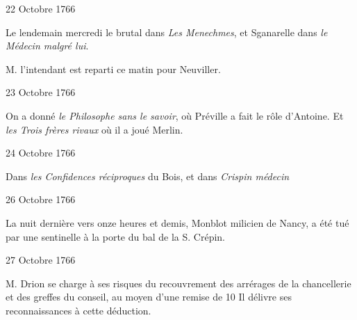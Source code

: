                      \begin{diary}{22 Octobre 1766}{}

                         Le lendemain mercredi le brutal dans
                           \emph{Les Menechmes}, et Sganarelle dans \emph{le Médecin
                              malgré lui}. \bigskip



                           M. l’intendant est reparti ce
                           matin pour
                           Neuviller. \bigskip


                     \end{diary}

                     \begin{diary}{23 Octobre 1766}{}

                         On a donné \emph{le
                              Philosophe sans le savoir},
                           où Préville a fait le rôle d’Antoine. Et
                           \emph{les Trois frères rivaux} où il a joué
                           Merlin. \bigskip


                     \end{diary}

                     \begin{diary}{24 Octobre 1766}{}

                         Dans \emph{les
                              Confidences réciproques}
                           du Bois, et dans
                           \emph{Crispin médecin}
                        \bigskip


                     \end{diary}

                     \begin{diary}{26 Octobre 1766}{}

                         La nuit dernière vers onze heures
                           et demis,
                           Monblot milicien de Nancy, a été tué
                           par une sentinelle à la
                           porte du bal de la
                           S. Crépin. \bigskip


                     \end{diary}

                     \begin{diary}{27 Octobre 1766}{}


                           M. Drion se charge à ses risques du
                           recouvrement des arrérages
                           de la chancellerie
                           et des greffes du conseil, au
                           moyen d’une
                           remise de 10%
                           Il délivre ses reconnaissances à cette déduction. \bigskip


                     \end{diary}

